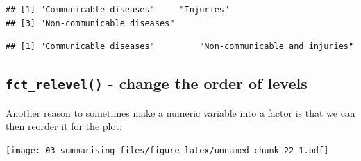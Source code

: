 \documentclass[]{book}
\makeatletter
\newenvironment{Shaded}{\begin{snugshade}}{\end{snugshade}}
\newcommand{\CommentTok}[1]{\textcolor[rgb]{0.56,0.35,0.01}{\textit{#1}}}
\newcommand{\DataTypeTok}[1]{\textcolor[rgb]{0.13,0.29,0.53}{#1}}
\newcommand{\KeywordTok}[1]{\textcolor[rgb]{0.13,0.29,0.53}{\textbf{#1}}}
\newcommand{\NormalTok}[1]{#1}
\newcommand{\OperatorTok}[1]{\textcolor[rgb]{0.81,0.36,0.00}{\textbf{#1}}}
\newcommand{\StringTok}[1]{\textcolor[rgb]{0.31,0.60,0.02}{#1}}
\newenvironment{kframe}{%
\medskip{}
\setlength{\fboxsep}{.8em}
 \def\at@end@of@kframe{}%
 \ifinner\ifhmode%
  \def\at@end@of@kframe{\end{minipage}}%
  \begin{minipage}{\columnwidth}%
 \fi\fi%
 \def\FrameCommand##1{\hskip\@totalleftmargin \hskip-\fboxsep
 \colorbox{shadecolor}{##1}\hskip-\fboxsep
     \hskip-\linewidth \hskip-\@totalleftmargin \hskip\columnwidth}%
 \MakeFramed {\advance\hsize-\width
   \@totalleftmargin\z@ \linewidth\hsize
   \@setminipage}}%
 {\par\unskip\endMakeFramed%
 \at@end@of@kframe}
\renewenvironment{Shaded}{\begin{kframe}}{\end{kframe}}
\theoremstyle{definition}
\theoremstyle{definition}
\theoremstyle{definition}
\theoremstyle{remark}
\makeatother
\begin{document}
\begin{verbatim}
## [1] "Communicable diseases"     "Injuries"                 
## [3] "Non-communicable diseases"
\end{verbatim}

\begin{Shaded}
\end{Shaded}

\begin{verbatim}
## [1] "Communicable diseases"         "Non-communicable and injuries"
\end{verbatim}

\hypertarget{fct_relevel---change-the-order-of-levels}{%
\subsection{\texorpdfstring{\texttt{fct\_relevel()} - change the order
of
levels}{fct\_relevel() - change the order of levels}}\label{fct_relevel---change-the-order-of-levels}}

Another reason to sometimes make a numeric variable into a factor is
that we can then reorder it for the plot:

\begin{Shaded}
\end{Shaded}

\texttt{[image: 03\_summarising\_files/figure-latex/unnamed-chunk-22-1.pdf]}
\end{document}
